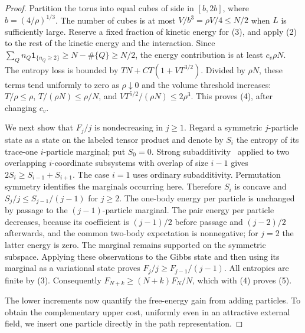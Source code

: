 \begin{proof}
Partition the torus into equal cubes of side in $[b,2b]$, where
$b=(4/\rho)^{1/3}$. The number of cubes is at most
$V/b^3=\rho V/4\leq N/2$ when $L$ is sufficiently large.
Reserve a fixed fraction of kinetic energy for (3), and apply (2)
to the rest of the kinetic energy and the interaction. Since
$\sum_Q n_Q\mathbf1_{\{n_Q\geq2\}}\geq N-\#\{Q\}\geq N/2$,
the energy contribution is at least $c_v\rho N$.
The entropy loss is bounded by
$TN+C T(1+VT^{3/2})$. Divided by $\rho N$, these terms tend uniformly
to zero as $\rho\downarrow0$ and the volume threshold increases:
$T/\rho\leq\rho$, $T/(\rho N)\leq\rho/N$, and
$VT^{5/2}/(\rho N)\leq2\rho^3$. This proves (4), after changing $c_v$.

We next show that $F_j/j$ is nondecreasing in $j\geq1$.
Regard a symmetric $j$-particle state as a state on the labeled tensor
product and denote by $S_i$ the entropy of its trace-one
$i$-particle marginal; put $S_0=0$. Strong subadditivity~\cite[Theorem~2 and Section~IV]{LiebRuskai1973Entropy} applied to
two overlapping $i$-coordinate subsystems with overlap of size
$i-1$ gives $2S_i\geq S_{i-1}+S_{i+1}$. The case $i=1$ uses
ordinary subadditivity. Permutation symmetry identifies the
marginals occurring here. Therefore $S_i$ is concave and
$S_j/j\leq S_{j-1}/(j-1)$ for $j\geq2$.
The one-body energy per particle is unchanged by passage to the
$(j-1)$-particle marginal. The pair energy per particle decreases,
because its coefficient is $(j-1)/2$ before passage and $(j-2)/2$
afterwards, and the common two-body expectation is nonnegative;
for $j=2$ the latter energy is zero. The marginal remains supported
on the symmetric subspace. Applying these observations to the Gibbs
state and then using its marginal as a variational state proves
$F_j/j\geq F_{j-1}/(j-1)$. All entropies are finite by (3).
Consequently
$F_{N+k}\geq(N+k)F_N/N$, which with (4) proves (5).

The lower increments now quantify the free-energy gain from adding
particles. To obtain the complementary upper cost, uniformly even in
an attractive external field, we insert one particle directly in the
path representation.


\end{proof}
